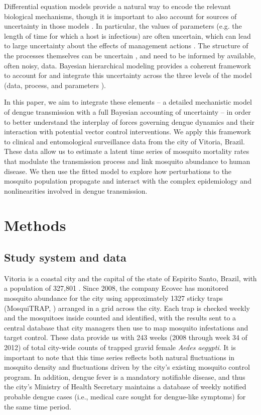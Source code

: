 \documentclass[10pt,letterpaper]{article}
\begin{document}
Differential equation models provide a natural way to encode the relevant biological mechanisms, though it is important to also account for sources of uncertainty in those models \cite{Hotelling1927, Wikle2010}.
In particular, the values of parameters (e.g. the length of time for which a host is infectious) are often uncertain, which can lead to large uncertainty about the effects of management actions \cite{Elderd2006}.
The structure of the processes themselves can be uncertain \cite{Ellner1998}, and need to be informed by available, often noisy, data.
Bayesian hierarchical modeling provides a coherent framework to account for and integrate this uncertainty across the three levels of the model (data, process, and parameters \cite{Berliner1996, Cressie2009}).

In this paper, we aim to integrate these elements -- a detailed mechanistic model of dengue transmission with a full Bayesian accounting of uncertainty -- in order to better understand the interplay of forces governing dengue dynamics and their interaction with potential vector control interventions.
We apply this framework to clinical and entomological surveillance data from the city of Vitoria, Brazil.
These data allow us to estimate a latent time series of mosquito mortality rates that modulate the transmission process and link mosquito abundance to human disease.  
We then use the fitted model to explore how perturbations to the mosquito population propagate and interact with the complex epidemiology and nonlinearities involved in dengue transmission.

\section*{Methods}

\subsection*{Study system and data}

Vitoria is a coastal city and the capital of the state of Espirito Santo, Brazil, with a population of 327,801 \cite{vitpop}.
Since 2008, the company Ecovec has monitored mosquito abundance for the city using approximately 1327 sticky traps (MosquiTRAP, \cite{Eiras2009}) arranged in a grid across the city.
Each trap is checked weekly and the mosquitoes inside counted and identified, with the results sent to a central database that city managers then use to map mosquito infestations and target control.
These data provide us with 243 weeks (2008 through week 34 of 2012) of total city-wide counts of trapped gravid female \emph{Aedes aegypti}.
It is important to note that this time series reflects both natural fluctuations in mosquito density and fluctuations driven by the city's existing mosquito control program.
In addition, dengue fever is a mandatory notifiable disease, and thus the city's Ministry of Health Secretary maintains a database of weekly notified probable dengue cases (i.e., medical care sought for dengue-like symptoms) for the same time period.
\end{document}
